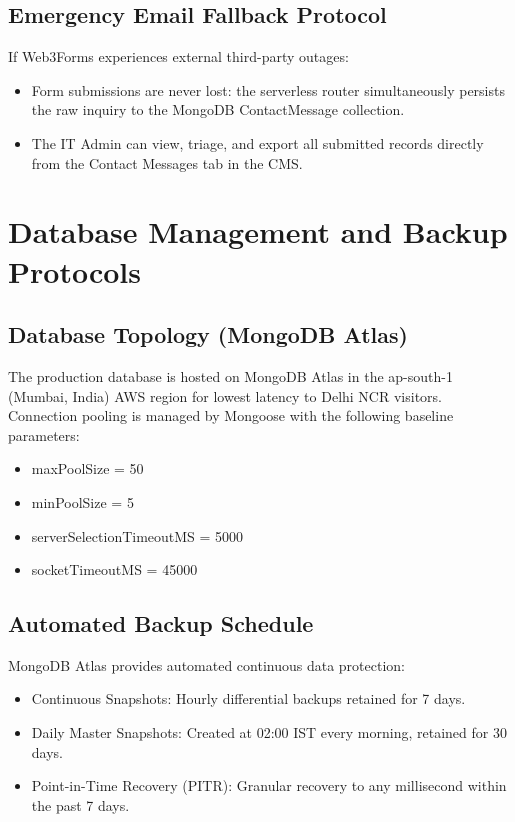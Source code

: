 \documentclass[11pt,a4paper,oneside]{report}
\def\textbf#1{#1}
\def\texttt#1{#1}
\def\&{and}
\begin{document}
\section{Emergency Email Fallback Protocol}

If Web3Forms experiences external third-party outages:
\begin{itemize}
  \item Form submissions are \textbf{never lost}: the serverless router simultaneously
        persists the raw inquiry to the MongoDB \texttt{ContactMessage} collection.
  \item The IT Admin can view, triage, and export all submitted records directly from
        the \texttt{Contact Messages} tab in the CMS.
\end{itemize}

\chapter{Database Management \texorpdfstring{\&}{and} Backup Protocols}

\section{Database Topology (MongoDB Atlas)}

The production database is hosted on MongoDB Atlas in the \texttt{ap-south-1} (Mumbai, India)
AWS region for lowest latency to Delhi NCR visitors.
Connection pooling is managed by Mongoose with the following baseline parameters:
\begin{itemize}
  \item \texttt{maxPoolSize = 50}
  \item \texttt{minPoolSize = 5}
  \item \texttt{serverSelectionTimeoutMS = 5000}
  \item \texttt{socketTimeoutMS = 45000}
\end{itemize}

\section{Automated Backup Schedule}

MongoDB Atlas provides automated continuous data protection:
\begin{itemize}
  \item \textbf{Continuous Snapshots:} Hourly differential backups retained for 7 days.
  \item \textbf{Daily Master Snapshots:} Created at 02:00 IST every morning, retained for 30 days.
  \item \textbf{Point-in-Time Recovery (PITR):} Granular recovery to any millisecond within the past 7 days.
\end{itemize}
\end{document}
